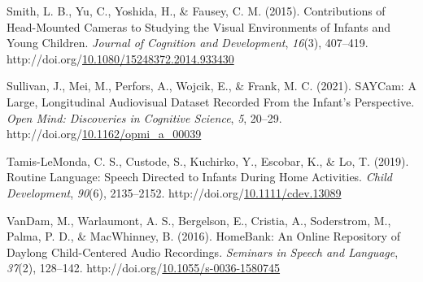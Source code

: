 \documentclass[10pt, letterpaper]{article}
\newlength{\cslhangindent}
\newlength{\cslentryspacingunit} %
\newenvironment{CSLReferences}[2] %
{%
	\setlength{\parindent}{0pt}
	\ifodd #1
	\let\oldpar\par
	\def\par{\hangindent=\cslhangindent\oldpar}
	\fi
}%
{}
\begin{document}
\begin{CSLReferences}{1}{0}
\leavevmode{}%
Smith, L. B., Yu, C., Yoshida, H., \& Fausey, C. M. (2015).
Contributions of {Head-Mounted Cameras} to {Studying} the {Visual
Environments} of {Infants} and {Young Children}. \emph{Journal of
Cognition and Development}, \emph{16}(3), 407--419.
http://doi.org/\href{https://doi.org/10.1080/15248372.2014.933430}{10.1080/15248372.2014.933430}

\leavevmode{}%
Sullivan, J., Mei, M., Perfors, A., Wojcik, E., \& Frank, M. C. (2021).
{SAYCam}: {A Large}, {Longitudinal Audiovisual Dataset Recorded From}
the {Infant}'s {Perspective}. \emph{Open Mind: Discoveries in Cognitive
Science}, \emph{5}, 20--29.
http://doi.org/\href{https://doi.org/10.1162/opmi_a_00039}{10.1162/opmi\_a\_00039}

\leavevmode{}%
Tamis-LeMonda, C. S., Custode, S., Kuchirko, Y., Escobar, K., \& Lo, T.
(2019). Routine {Language}: {Speech Directed} to {Infants During Home
Activities}. \emph{Child Development}, \emph{90}(6), 2135--2152.
http://doi.org/\href{https://doi.org/10.1111/cdev.13089}{10.1111/cdev.13089}

\leavevmode{}%
VanDam, M., Warlaumont, A. S., Bergelson, E., Cristia, A., Soderstrom,
M., Palma, P. D., \& MacWhinney, B. (2016). {HomeBank}: {An Online
Repository} of {Daylong Child-Centered Audio Recordings}. \emph{Seminars
in Speech and Language}, \emph{37}(2), 128--142.
http://doi.org/\href{https://doi.org/10.1055/s-0036-1580745}{10.1055/s-0036-1580745}

\end{CSLReferences}


\end{document}
